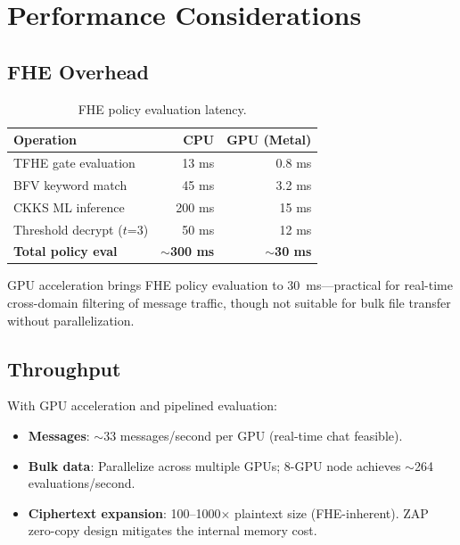 \documentclass[11pt,letterpaper]{article}
\begin{document}
\section{Performance Considerations}

\subsection{FHE Overhead}

\begin{table}[H]
\centering
\begin{tabular}{@{}lrr@{}}
\toprule
\textbf{Operation} & \textbf{CPU} & \textbf{GPU (Metal)} \\
\midrule
TFHE gate evaluation & 13 ms & 0.8 ms \\
BFV keyword match & 45 ms & 3.2 ms \\
CKKS ML inference & 200 ms & 15 ms \\
Threshold decrypt ($t$=3) & 50 ms & 12 ms \\
\midrule
\textbf{Total policy eval} & \textbf{$\sim$300 ms} & \textbf{$\sim$30 ms} \\
\bottomrule
\end{tabular}
\caption{FHE policy evaluation latency.}
\label{tab:fhe-perf}
\end{table}

GPU acceleration brings FHE policy evaluation to 30~ms---practical for real-time cross-domain filtering of message traffic, though not suitable for bulk file transfer without parallelization.

\subsection{Throughput}

With GPU acceleration and pipelined evaluation:
\begin{itemize}
\item \textbf{Messages}: $\sim$33 messages/second per GPU (real-time chat feasible).
\item \textbf{Bulk data}: Parallelize across multiple GPUs; 8-GPU node achieves $\sim$264 evaluations/second.
\item \textbf{Ciphertext expansion}: 100--1000$\times$ plaintext size (FHE-inherent). ZAP zero-copy design mitigates the internal memory cost.
\end{itemize}
\end{document}
